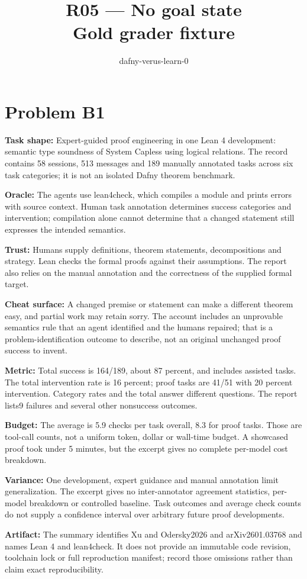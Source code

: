 \documentclass[11pt]{article}
\title{R05 --- No goal state \\ \large Gold grader fixture}
\author{dafny-verus-learn-0}
\date{}
\begin{document}
\maketitle
\section*{Problem B1}\label{ans:B1}
\begin{answer}
\textbf{Task shape:} Expert-guided proof engineering in one Lean 4 development: semantic type soundness of System Capless using logical relations. The record contains 58 sessions, 513 messages and 189 manually annotated tasks across six task categories; it is not an isolated Dafny theorem benchmark.

\textbf{Oracle:} The agents use lean4check, which compiles a module and prints errors with source context. Human task annotation determines success categories and intervention; compilation alone cannot determine that a changed statement still expresses the intended semantics.

\textbf{Trust:} Humans supply definitions, theorem statements, decompositions and strategy. Lean checks the formal proofs against their assumptions. The report also relies on the manual annotation and the correctness of the supplied formal target.

\textbf{Cheat surface:} A changed premise or statement can make a different theorem easy, and partial work may retain sorry. The account includes an unprovable semantics rule that an agent identified and the humans repaired; that is a problem-identification outcome to describe, not an original unchanged proof success to invent.

\textbf{Metric:} Total success is 164/189, about 87 percent, and includes assisted tasks. The total intervention rate is 16 percent; proof tasks are 41/51 with 20 percent intervention. Category rates and the total answer different questions. The report lists9 failures and several other nonsuccess outcomes.

\textbf{Budget:} The average is 5.9 checks per task overall, 8.3 for proof tasks. Those are tool-call counts, not a uniform token, dollar or wall-time budget. A showcased proof took under 5 minutes, but the excerpt gives no complete per-model cost breakdown.

\textbf{Variance:} One development, expert guidance and manual annotation limit generalization. The excerpt gives no inter-annotator agreement statistics, per-model breakdown or controlled baseline. Task outcomes and average check counts do not supply a confidence interval over arbitrary future proof developments.

\textbf{Artifact:} The summary identifies Xu and Odersky2026 and arXiv2601.03768 and names Lean 4 and lean4check. It does not provide an immutable code revision, toolchain lock or full reproduction manifest; record those omissions rather than claim exact reproducibility.
\end{answer}
\end{document}
